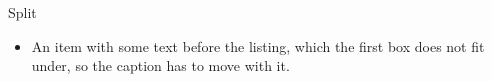 \documentclass[aspectratio=43,10pt]{beamer}
\begin{document}
\begin{frame}[allowframebreaks]{Split}
	\begin{itemize}
		\item An item with some text before the listing, which the first box does not fit under, so the caption
		has to move with it.
		
	\end{itemize}
\end{frame}
\end{document}
